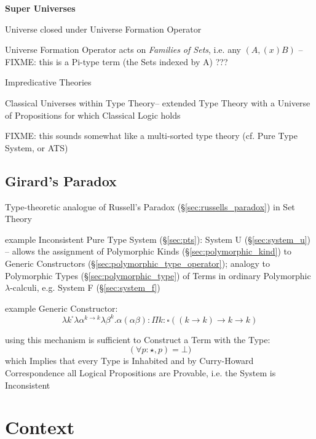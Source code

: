 \textbf{Super Universes}

Universe closed under Universe Formation Operator

Universe Formation Operator acts on \emph{Families of Sets}, i.e. any
$(A, (x)B)$ -- FIXME: this is a Pi-type term (the Sets indexed by A)
???


Impredicative Theories

Classical Universes within Type Theory-- extended Type Theory with a
Universe of Propositions for which Classical Logic holds

FIXME: this sounds somewhat like a multi-sorted type theory (cf. Pure
Type System, or ATS)



\endgroup %



\subsection{Girard's Paradox}\label{sec:girards_paradox}

Type-theoretic analogue of Russell's Paradox
(\S\ref{sec:russells_paradox}) in Set Theory

example Inconsistent Pure Type System (\S\ref{sec:pts}): System U
(\S\ref{sec:system_u}) -- allows the assignment of Polymorphic Kinds
(\S\ref{sec:polymorphic_kind}) to Generic Constructors
(\S\ref{sec:polymorphic_type_operator}); analogy to Polymorphic Types
(\S\ref{sec:polymorphic_type}) of Terms in ordinary Polymorphic
$\lambda$-calculi, e.g. System F (\S\ref{sec:system_f})

example Generic Constructor:
\[
  \lambda k^\square \lambda \alpha^{k \rightarrow k}\lambda\beta^k.
    \alpha(\alpha\beta) :
  \Pi k:\square((k \rightarrow k) \rightarrow k \rightarrow k)
\]

using this mechanism is sufficient to Construct a Term with the Type:
\[
  (\forall p:\star,p) = \bot)
\]
which Implies that every Type is Inhabited and by Curry-Howard
Correspondence all Logical Propositions are Provable, i.e. the System
is Inconsistent



\section{Context}\label{sec:type_context}

